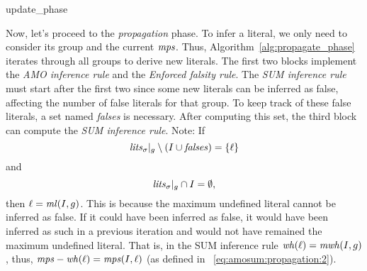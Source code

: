 \begin{algorithm}[H]\small
    \caption{update\_phase}
    \label{alg:update_phase}
\end{algorithm}

Now, let's proceed to the \textit{propagation} phase. 
To infer a literal, we only need to consider its group and the current $\mathit{mps}$. 
Thus, Algorithm~\ref{alg:propagate_phase} iterates through all groups to derive new literals. 
The first two blocks implement the \textit{AMO inference rule} and the \textit{Enforced falsity rule}. 
The \textit{SUM inference rule} must start after the first two since some new literals can be inferred as false, 
affecting the number of false literals for that group. 
To keep track of these false literals, a set named \textit{falses} is necessary. 
After computing this set, the third block can compute the \textit{SUM inference rule}.
Note: If 
\[
\mathit{lits}_\sigma|_g \setminus (I \cup \mathit{falses}) = \{\ell\}
\]
and
\[
\mathit{lits}_\sigma|_g \cap I = \emptyset,
\]
then \(\ell = \mathit{ml}(I,g)\). This is because the maximum undefined literal cannot be inferred as false. If it could have been inferred as false, it would have been inferred as such in a previous iteration and would not have remained the maximum undefined literal.
That is, in the SUM inference rule $\mathit{wh}(\ell) = \mathit{mwh}(I,g)$, 
thus, $\mathit{mps} - \mathit{wh}(\ell) = \mathit{mps}(I,\ell)$ (as defined in ~\ref{eq:amosum:propagation:2}).

